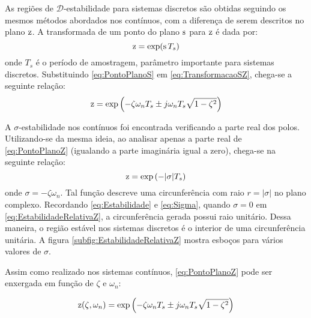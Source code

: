 As regiões de $\mathscr{D}$-estabilidade para sistemas discretos são obtidas seguindo os mesmos métodos abordados nos contínuos, com a diferença de serem descritos no plano $\operatorname{\mathrm{z}}$. A transformada de um ponto do plano $\operatorname{\mathrm{s}}$ para $\operatorname{\mathrm{z}}$ é dada por:
\begin{equation}
  \operatorname{\mathrm{z}} = \exp(\operatorname{\mathrm{s}} T_s)\label{eq:TransformacaoSZ}
\end{equation}
onde $T_s$ é o período de amostragem, parâmetro importante para sistemas discretos\cite{KUO1980}. Substituindo \eqref{eq:PontoPlanoS} em \eqref{eq:TransformacaoSZ}, chega-se a seguinte relação:
\begin{equation}
  \operatorname{\mathrm{z}} = \exp{\left(-\zeta\omega_nT_s \pm j\omega_nT_s\sqrt{1-\zeta^2}\right)}\label{eq:PontoPlanoZ}
\end{equation}

A $\sigma$-estabilidade nos contínuos foi encontrada verificando a parte real dos polos. Utilizando-se da mesma ideia, ao analisar apenas a parte real de \eqref{eq:PontoPlanoZ} (igualando a parte imaginária igual a zero), chega-se na seguinte relação:
\begin{equation}
  \operatorname{\mathrm{z}} = \exp{\left(-|\sigma|T_s\right)}\label{eq:EstabilidadeRelativaZ}
\end{equation}
onde $\sigma = -\zeta\omega_n$. Tal função descreve uma circunferência com raio $r = |\sigma|$ no plano complexo. Recordando \eqref{eq:Estabilidade} e \eqref{eq:Sigma}, quando $\sigma = 0$ em \eqref{eq:EstabilidadeRelativaZ}, a circunferência gerada possui raio unitário. Dessa maneira, o região estável nos sistemas discretos é o interior de uma circunferência unitária. A figura \ref{subfig:EstabilidadeRelativaZ} mostra esboços para vários valores de $\sigma$. 

Assim como realizado nos sistemas contínuos, \eqref{eq:PontoPlanoZ} pode ser enxergada em função de $\zeta$ e $\omega_n$:

\begin{equation}
  \operatorname{\mathrm{z}}(\zeta,\omega_n) = \exp{\left(-\zeta\omega_nT_s \pm j\omega_nT_s\sqrt{1-\zeta^2}\right)}\label{eq:FuncaoPontoZ}
\end{equation}

